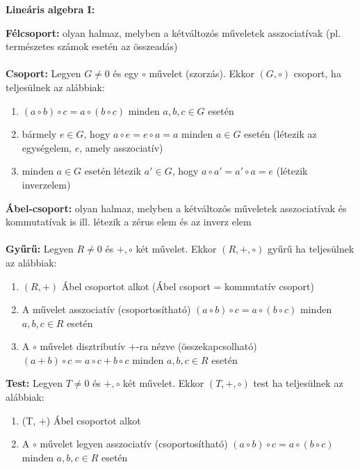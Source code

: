 \documentclass[11pt,a4paper]{article}
\begin{document}
 \newpage
\textbf{Lineáris algebra I:}
\begin{tcolorbox}[colback=blue!5!white,colframe=blue!70!black,title= 1. Csoport{,} gyűrű{,} test]
    \textbf{Félcsoport:} olyan halmaz, melyben a kétváltozós műveletek asszociatívak (pl. természetes számok esetén az összeadás)\\\\
        \textbf{Csoport:} Legyen \(G\neq 0\) és egy \(\circ \) művelet (szorzás). Ekkor \((G, \circ )\) csoport, ha teljesülnek az alábbiak:
        \begin{enumerate}
            \item \((a \circ b) \circ c = a \circ (b \circ c)\) minden \(a, b, c \in G\) esetén
            \item bármely \(e \in G\), hogy \(a \circ e = e \circ a = a\) minden \(a \in G\) esetén (létezik az egységelem, \(e\), amely asszociatív)
            \item minden \(a \in G\) esetén létezik \(a' \in G\), hogy \(a \circ a'=a' \circ a = e\) (létezik inverzelem)
        \end{enumerate}
        \textbf{Ábel-csoport:} olyan halmaz, melyben a kétváltozós műveletek asszociatívak és kommutatívak is ill. létezik a zérus elem és az inverz elem\\\\
        \textbf{Gyűrű:}
        Legyen \(R\neq 0\) és \(+, \circ \) két művelet. Ekkor \((R, +, \circ )\) gyűrű ha teljesülnek az alábbiak:
        \begin{enumerate}
            \item \((R, +)\) Ábel csoportot alkot (Ábel csoport = kommutatív csoport)
            \item A  művelet asszociatív (csoportosítható) \((a \circ b) \circ c = a \circ (b \circ c)\) minden \(a, b, c \in R\) esetén
            \item A \(\circ \) művelet disztributív \(+\)-ra nézve (összekapcsolható) \((a + b) \circ c = a \circ c + b \circ c\) minden \(a, b, c \in R\) esetén
        \end{enumerate}
        \textbf{Test:} 
        Legyen \(T \neq 0\) és \(+, \circ \) két művelet. Ekkor \((T, +, \circ)\) test ha teljesülnek az alábbiak:
        \begin{enumerate}
            \item (T, +) Ábel csoportot alkot
            \item A \(\circ\) művelet legyen asszociatív (csoportosítható) \((a \circ b) \circ c = a \circ (b \circ c)\) minden \(a, b, c \in R\) esetén

\end{enumerate}
\end{tcolorbox}
\end{document}
